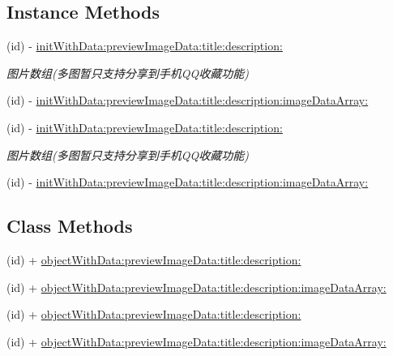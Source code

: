 \subsection*{Instance Methods}
\begin{DoxyCompactItemize}
\item 
(id) -\/ \mbox{\hyperlink{interface_q_q_api_extend_object_ac4d223cfe66c04b82c0c919fca3c83df}{init\+With\+Data\+:preview\+Image\+Data\+:title\+:description\+:}}
\begin{DoxyCompactList}\small\item\em 图片数组(多图暂只支持分享到手机\+Q\+Q收藏功能) \end{DoxyCompactList}\item 
(id) -\/ \mbox{\hyperlink{interface_q_q_api_extend_object_a89e1a2db54fc6b6a37715f44c0d92a06}{init\+With\+Data\+:preview\+Image\+Data\+:title\+:description\+:image\+Data\+Array\+:}}
\item 
(id) -\/ \mbox{\hyperlink{interface_q_q_api_extend_object_ac4d223cfe66c04b82c0c919fca3c83df}{init\+With\+Data\+:preview\+Image\+Data\+:title\+:description\+:}}
\begin{DoxyCompactList}\small\item\em 图片数组(多图暂只支持分享到手机\+Q\+Q收藏功能) \end{DoxyCompactList}\item 
(id) -\/ \mbox{\hyperlink{interface_q_q_api_extend_object_a89e1a2db54fc6b6a37715f44c0d92a06}{init\+With\+Data\+:preview\+Image\+Data\+:title\+:description\+:image\+Data\+Array\+:}}
\end{DoxyCompactItemize}
\subsection*{Class Methods}
\begin{DoxyCompactItemize}
\item 
(id) + \mbox{\hyperlink{interface_q_q_api_extend_object_a83cb8a1c9439cfe40dd07e86218f2049}{object\+With\+Data\+:preview\+Image\+Data\+:title\+:description\+:}}
\item 
(id) + \mbox{\hyperlink{interface_q_q_api_extend_object_add101a6aa72744bb3b5f59bfd119bf1c}{object\+With\+Data\+:preview\+Image\+Data\+:title\+:description\+:image\+Data\+Array\+:}}
\item 
(id) + \mbox{\hyperlink{interface_q_q_api_extend_object_a83cb8a1c9439cfe40dd07e86218f2049}{object\+With\+Data\+:preview\+Image\+Data\+:title\+:description\+:}}
\item 
(id) + \mbox{\hyperlink{interface_q_q_api_extend_object_add101a6aa72744bb3b5f59bfd119bf1c}{object\+With\+Data\+:preview\+Image\+Data\+:title\+:description\+:image\+Data\+Array\+:}}
\end{DoxyCompactItemize}
